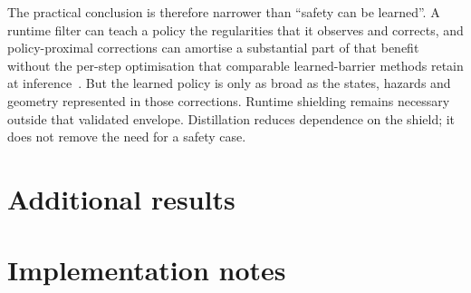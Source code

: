 \documentclass[a4paper,11pt]{report}
\begin{document}
The practical conclusion is therefore narrower than ``safety can be learned''. A runtime filter can
teach a policy the regularities that it observes and corrects, and policy-proximal corrections can
amortise a substantial part of that benefit without the per-step optimisation that comparable
learned-barrier methods retain at inference~\cite{meng2024conbat,sun2025lpb}. But the learned
policy is only as broad as the states, hazards and geometry represented in those corrections.
Runtime shielding remains necessary outside that validated envelope. Distillation reduces
dependence on the shield; it does not remove the need for a safety case.





\appendix
\chapter{Additional results}

\chapter{Implementation notes}
\end{document}
